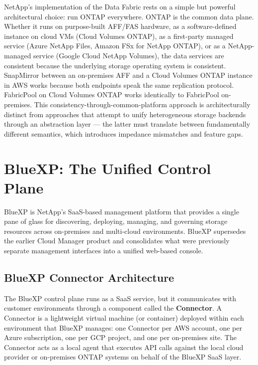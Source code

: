 NetApp's implementation of the Data Fabric rests on a simple but powerful architectural choice: run ONTAP everywhere. ONTAP is the common data plane. Whether it runs on purpose-built AFF/FAS hardware, as a software-defined instance on cloud VMs (Cloud Volumes ONTAP), as a first-party managed service (Azure NetApp Files, Amazon FSx for NetApp ONTAP), or as a NetApp-managed service (Google Cloud NetApp Volumes), the data services are consistent because the underlying storage operating system is consistent. SnapMirror between an on-premises AFF and a Cloud Volumes ONTAP instance in AWS works because both endpoints speak the same replication protocol. FabricPool on Cloud Volumes ONTAP works identically to FabricPool on-premises. This consistency-through-common-platform approach is architecturally distinct from approaches that attempt to unify heterogeneous storage backends through an abstraction layer --- the latter must translate between fundamentally different semantics, which introduces impedance mismatches and feature gaps.

\section{BlueXP: The Unified Control Plane}

BlueXP is NetApp's SaaS-based management platform that provides a single pane of glass for discovering, deploying, managing, and governing storage resources across on-premises and multi-cloud environments. BlueXP supersedes the earlier Cloud Manager product and consolidates what were previously separate management interfaces into a unified web-based console.

\subsection{BlueXP Connector Architecture}

The BlueXP control plane runs as a SaaS service, but it communicates with customer environments through a component called the \textbf{Connector}. A Connector is a lightweight virtual machine (or container) deployed within each environment that BlueXP manages: one Connector per AWS account, one per Azure subscription, one per GCP project, and one per on-premises site. The Connector acts as a local agent that executes API calls against the local cloud provider or on-premises ONTAP systems on behalf of the BlueXP SaaS layer.

